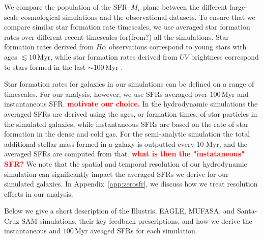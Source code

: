 \documentclass[preprint2,tighten]{aastex62}
\newcommand{\todo}[1]{{\bf \textcolor{red}{ #1}}}
\begin{document}
We compare the population of the SFR--$M_{\star}$ plane between the different large-scale cosmological simulations and the observational datasets. To ensure that we compare similar star formation rate timescales, we use averaged star formation rates over different recent timescales for(from?) all the simulations. Star formation rates derived from $H{\alpha}$ observations correspond to young stars with ages $\lesssim 10\,\mathrm{Myr}$, while star formation rates derived from $UV$ brightness correspond to stars formed in the last $\sim 100\,\mathrm{Myr}$ \citep[e.g.][]{kennicutt2012}. 

Star formation rates for galaxies in our simulations can be defined on 
a range of timescales. For our analysis, however, we use SFRs averaged 
over $100\,\mathrm{Myr}$ and instantaneous SFR. \todo{motivate our choice.}
In the hydrodynamic simulations the averaged SFRs are derived using the ages, or formation times, of star particles in the simulated 
galaxies, while instantaneous SFRs are based on 
the rate of star formation in the dense and cold gas. For the semi-analytic simulation the total additional stellar mass formed in a galaxy is outputted every 10 Myr, and the averaged SFRs are computed from that. \todo{what is then the "instataneous" SFR?}
We note that the spatial and temporal resolution of our hydrodynamic 
simulation can significantly impact the averaged SFRs we derive for our 
simulated galaxies. In Appendix~\ref{app:zerosfr}, we discuss how we treat
resolution effects in our analysis. 

Below we give a short description of the Illustris, EAGLE, MUFASA, and 
Santa-Cruz SAM simulations, their key feedback prescriptions, and how 
we derive the instantaneous and $100\,\mathrm{Myr}$ aveaged SFRs for 
each simulation.


\end{document}
